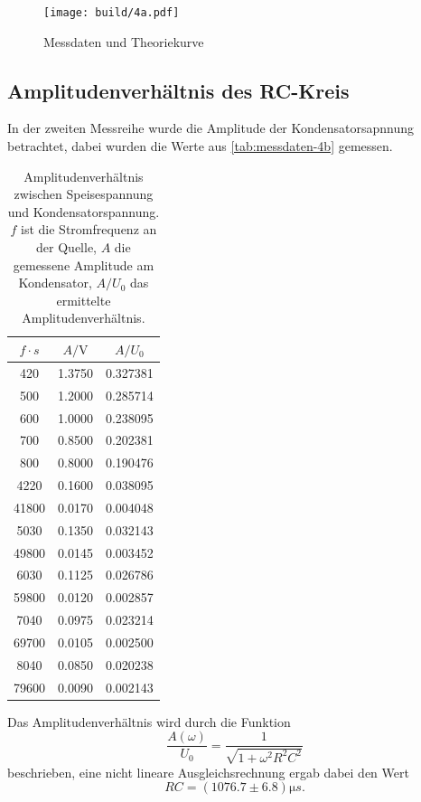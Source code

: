 \begin{figure}[H]
	\centering
	\texttt{[image: build/4a.pdf]}
	\caption{Messdaten und Theoriekurve}
	\label{fig:plot-4a}
\end{figure}


\subsection{Amplitudenverhältnis des RC-Kreis}
\label{sec:4b-auswertung}
In der zweiten Messreihe wurde die Amplitude der Kondensatorsapnnung betrachtet, dabei 
wurden die Werte aus \autoref{tab:messdaten-4b} gemessen.

\begin{table}
	\centering
	\caption{Amplitudenverhältnis zwischen Speisespannung und Kondensatorspannung.
	$f$ ist die Stromfrequenz an der Quelle, $A$ die gemessene Amplitude am 
	Kondensator, $A/U_0$ das ermittelte Amplitudenverhältnis.}
	\label{tab:messdaten-4b}
	\begin{tabular}{c c c}
		\toprule
		$f \cdot \si{s}$ & $A / \si{\volt}$  & $A / U_0$ \\
		\midrule
		 420   & 1.3750  & 0.327381 \\
	         500  & 1.2000  & 0.285714 \\
	         600  & 1.0000  & 0.238095 \\
	         700  & 0.8500  & 0.202381 \\
	         800  & 0.8000  & 0.190476 \\
	        4220  & 0.1600  & 0.038095 \\
	       41800  & 0.0170  & 0.004048 \\
	        5030  & 0.1350  & 0.032143 \\
	       49800  & 0.0145  & 0.003452 \\
	        6030  & 0.1125  & 0.026786 \\
	       59800  & 0.0120  & 0.002857 \\
	        7040  & 0.0975  & 0.023214 \\
	       69700  & 0.0105  & 0.002500 \\
	        8040  & 0.0850  & 0.020238 \\
	       79600  & 0.0090  & 0.002143 \\
		\bottomrule
	\end{tabular}
\end{table}

Das Amplitudenverhältnis wird durch die Funktion
\begin{equation}
	\frac{A(\omega)}{U_0}
	=
	\frac{1}{\sqrt{1 + \omega^2 R^2 C^2}}
\end{equation}
beschrieben, eine nicht lineare Ausgleichsrechnung ergab dabei den Wert
\begin{equation}
	RC = (1076.7 \pm 6.8) \si{\micro s}.
	\label{eqn:ergebnis-4b}
\end{equation}

